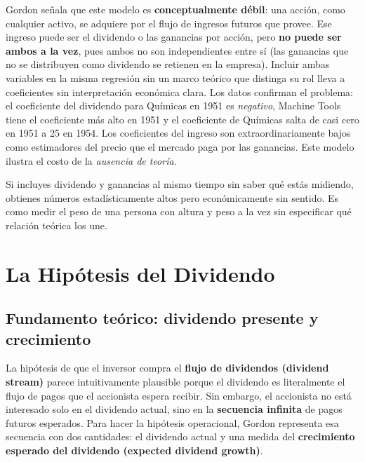 \documentclass[12pt]{article}
\begin{document}
\begin{explicacion}
Gordon se\~nala que este modelo es \textbf{conceptualmente d\'ebil}: una acci\'on, como cualquier activo, se adquiere por el flujo de ingresos futuros que provee. Ese ingreso puede ser el dividendo o las ganancias por acci\'on, pero \textbf{no puede ser ambos a la vez}, pues ambos no son independientes entre s\'i (las ganancias que no se distribuyen como dividendo se retienen en la empresa). Incluir ambas variables en la misma regresi\'on sin un marco te\'orico que distinga su rol lleva a coeficientes sin interpretaci\'on econ\'omica clara. Los datos confirman el problema: el coeficiente del dividendo para Qu\'imicas en 1951 es \textit{negativo}, Machine Tools tiene el coeficiente m\'as alto en 1951 y el coeficiente de Qu\'imicas salta de casi cero en 1951 a 25 en 1954. Los coeficientes del ingreso son extraordinariamente bajos como estimadores del precio que el mercado paga por las ganancias. Este modelo ilustra el costo de la \textit{ausencia de teor\'ia}.
\end{explicacion}

\begin{intuicion}
Si incluyes dividendo y ganancias al mismo tiempo sin saber qu\'e est\'as midiendo, obtienes n\'umeros estad\'isticamente altos pero econ\'omicamente sin sentido. Es como medir el peso de una persona con altura y peso a la vez sin especificar qu\'e relaci\'on te\'orica los une.
\end{intuicion}

\section{La Hip\'otesis del Dividendo}

\subsection{Fundamento te\'orico: dividendo presente y crecimiento}

La hip\'otesis de que el inversor compra el \textbf{flujo de dividendos (dividend stream)} parece intuitivamente plausible porque el dividendo es literalmente el flujo de pagos que el accionista espera recibir. Sin embargo, el accionista no est\'a interesado solo en el dividendo actual, sino en la \textbf{secuencia infinita} de pagos futuros esperados. Para hacer la hip\'otesis operacional, Gordon representa esa secuencia con dos cantidades: el dividendo actual y una medida del \textbf{crecimiento esperado del dividendo (expected dividend growth)}.
\end{document}
